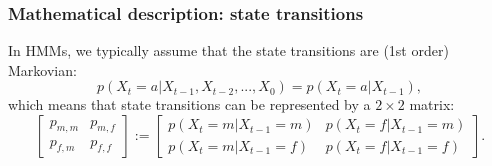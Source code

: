 \documentclass[main.tex]{subfiles}
\begin{document}
\begin{frame}
\frametitle{Mathematical description: state transitions}

In HMMs, we typically assume that the state transitions are (1st order) Markovian:
%
\begin{equation}
    p(X_t = a| X_{t-1}, X_{t-2},...,X_0) = p(X_t = a| X_{t-1}),
\end{equation}
%
which means that state transitions can be represented by a $2\times 2$ matrix:
%
\begin{equation}
        \begin{bmatrix} p_{m,m} & p_{m,f}\\ p_{f,m} & p_{f,f} \end{bmatrix} := \begin{bmatrix} p(X_t=m | X_{t-1}=m) & p(X_t=f | X_{t-1}=m) \\ p(X_t=m | X_{t-1}=f) & p(X_t=f | X_{t-1}=f) \end{bmatrix}.
\end{equation}
%
    
\end{frame}
\end{document}
